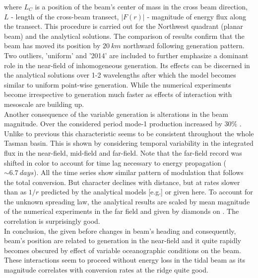 \documentclass[12pt]{article}
\begin{document}
where $L_{C}$ is a position of the beam's center of mass in the cross beam direction, $L$ - length 
of the cross-beam transect, $|F(r)|$ - magnitude of energy flux along the transect. This procedure 
is carried out for the Northwest quadrant (planar beam) and the analytical solutions. The 
comparison of results confirm that the beam has moved its position by $20~km$ 
northward  following generation pattern. Two outliers, 'uniform' 
and 
'2014'  are included to further emphasize a dominant role  in the near-field 
of inhomogeneous generation. Its effects can be discerned in the analytical solutions over 1-2 
wavelengths after which the model becomes similar to uniform point-wise generation. While the 
numerical experiments become irrespective to generation much faster as effects of interaction with 
mesoscale are building up.\\
Another consequence of the variable generation is alterations in the beam magnitude. Over the 
considered period mode-1 production increased by $30\%$ . Unlike to 
previous this characteristic seems to be consistent throughout the whole Tasman basin. This is 
shown by considering temporal variability in the integrated flux in the near-field, mid-field and 
far-field. Note that the far-field record was shifted in color to account for time lag necessary to 
energy propagation ($\sim 6.7~days$). All the time series show similar pattern of modulation that 
follows the total conversion. But character declines with distance, but at rates slower than 
as $1/r$ predicted by the analytical models \citep{zaron2014time}[e.g.] or given here. To account 
for the unknown spreading law, the analytical results are scaled by mean magnitude of the numerical 
experiments in the far field and given by diamonds on . The 
correlation is surprisingly good.\\
In conclusion, the given before changes in beam's heading and consequently, beam's position are 
related to generation in the near-field and it quite rapidly becomes obscured by effect of variable 
oceanographic conditions on the beam. These interactions seem to proceed without energy loss in the 
tidal beam as its magnitude correlates with conversion rates at the ridge quite good.
\end{document}
